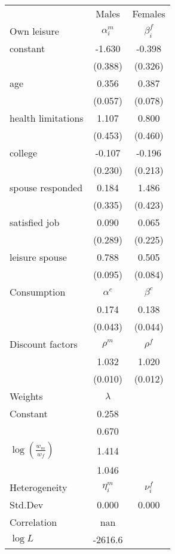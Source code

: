 \begin{tabular}{lcc} 
\hline\hline 
 & Males & Females \\ 
Own leisure & $\alpha_{i}^{m}$ & $\beta_{i}^{f}$ \\ 
constant & -1.630 & -0.398 \\ 
 & (0.388) & (0.326) \\ 
age & 0.356 & 0.387 \\ 
 & (0.057) & (0.078) \\ 
health limitations & 1.107 & 0.800 \\ 
 & (0.453) & (0.460) \\ 
college & -0.107 & -0.196 \\ 
 & (0.230) & (0.213) \\ 
spouse responded & 0.184 & 1.486 \\ 
 & (0.335) & (0.423) \\ 
satisfied job & 0.090 & 0.065 \\ 
 & (0.289) & (0.225) \\ 
leisure spouse & 0.788 & 0.505 \\ 
 & (0.095) & (0.084) \\ 
Consumption & $\alpha^{c}$ & $\beta^{c}$ \\ 
 & 0.174 & 0.138 \\ 
 & (0.043) & (0.044) \\ 
Discount factors & $\rho^m$ & $\rho^f$ \\ 
 & 1.032 & 1.020 \\ 
 & (0.010) & (0.012) \\ 
Weights & $\lambda$ &  \\ 
Constant & 0.258 &  \\ 
 & 0.670 &  \\ 
$\log(\frac{w_m}{w_f})$ & 1.414 &  \\ 
 & 1.046 &  \\ 
Heterogeneity & $\eta_i^m$ & $\nu_i^f$ \\ 
Std.Dev & 0.000 & 0.000 \\ 
Correlation & nan &  \\ 
\hline 
$\log L$ & -2616.6 & \\ 
\hline \hline 
\end{tabular} 
